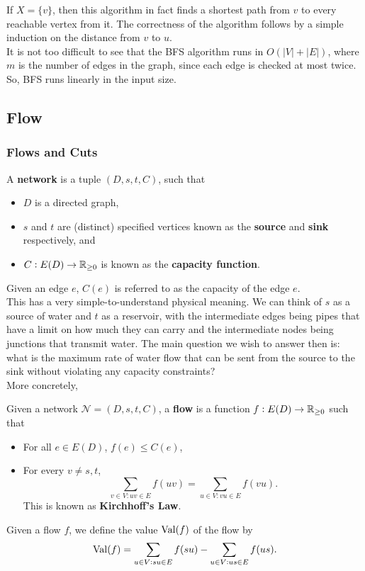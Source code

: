 			If $X = \{v\}$, then this algorithm in fact finds a shortest path from $v$ to every reachable vertex from it. The correctness of the algorithm follows by a simple induction on the distance from $v$ to $u$.\\

			It is not too difficult to see that the BFS algorithm runs in $O(|V|+|E|)$, where $m$ is the number of edges in the graph, since each edge is checked at most twice. So, BFS runs linearly in the input size.

	\subsection{Flow}

		\subsubsection{Flows and Cuts}

			\begin{fdef}[Network]
				A \textbf{network} is a tuple $(D,s,t,C)$, such that
				\begin{itemize}
					\item $D$ is a directed graph,
					\item $s$ and $t$ are (distinct) specified vertices known as the \textbf{source} and \textbf{sink} respectively, and
					\item $C : E(D) \to \mathbb{R}_{\ge 0}$ is known as the \textbf{capacity function}.
				\end{itemize}
			\end{fdef}

			Given an edge $e$, $C(e)$ is referred to as the capacity of the edge $e$.\\

			This has a very simple-to-understand physical meaning. We can think of $s$ as a source of water and $t$ as a reservoir, with the intermediate edges being pipes that have a limit on how much they can carry and the intermediate nodes being junctions that transmit water. The main question we wish to answer then is: what is the maximum rate of water flow that can be sent from the source to the sink without violating any capacity constraints?\\
			More concretely,

			\begin{fdef}[Flow]
				Given a network $\mathcal{N} = (D,s,t,C)$, a \textbf{flow} is a function $f: E(D) \to \mathbb{R}_{\ge 0}$ such that
				\begin{itemize}
					\item For all $e\in E(D)$, $f(e) \le C(e)$,
					\item For every $v \ne s,t$,
					\[ \sum_{v \in V : uv \in E} f(uv) = \sum_{u \in V : vu \in E} f(vu). \]
					This is known as \textbf{Kirchhoff's Law}.
				\end{itemize}

				Given a flow $f$, we define the value $\operatorname{Val}(f)$ of the flow by
				\[ \operatorname{Val}(f) = \sum_{u \in V : su \in E} f(su) - \sum_{u \in V : us \in E} f(us). \]
			\end{fdef}


